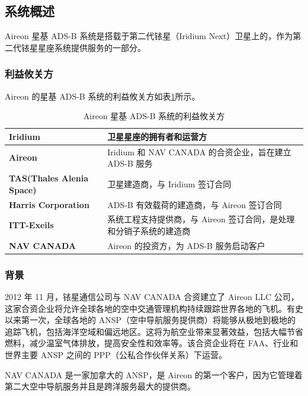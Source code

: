 \subsection{系统概述}

Aireon 星基 ADS-B 系统是搭载于第二代铱星（Iridium Next）卫星上的，作为第二代铱星星座系统提供服务的一部分。

\subsubsection{利益攸关方}

Aireon 的星基 ADS-B 系统的利益攸关方如表\ref{tab:stakeholders_of_Aireon_ads-b}所示。

\renewcommand\arraystretch{1.5}
\begin{table}[htbp]
\centering
\caption{Aireon 星基 ADS-B 系统的利益攸关方}
\label{tab:stakeholders_of_Aireon_ads-b}
\begin{tabular}[b]{|p{6cm}<{\raggedleft}|p{8cm}<{\raggedright}|}
\hline
\textbf{Iridium} & 卫星星座的拥有者和运营方 \\
\hline
\textbf{Aireon} & Iridium 和 NAV CANADA 的合资企业，旨在建立 ADS-B 服务 \\
\hline
\textbf{TAS(Thales Alenia Space)}& 卫星建造商，与 Iridium 签订合同 \\
\hline
\textbf{Harris Corporation} & ADS-B 有效载荷的建造商，与 Aireon 签订合同 \\
\hline
\textbf{ITT-Exeils} & 系统工程支持提供商，与 Aireon 签订合同，是处理和分销子系统的建造商 \\
\hline
\textbf{NAV CANADA} & Aireon 的投资方，为 ADS-B 服务启动客户 \\
\hline
\end{tabular}
\end{table}

\subsubsection{背景}

2012 年 11 月，铱星通信公司与 NAV CANADA 合资建立了 Aireon LLC 公司，这家合资企业将允许全球各地的空中交通管理机构持续跟踪世界各地的飞机。有史以来第一次，全球各地的 ANSP（空中导航服务提供商）将能够从极地到极地的追踪飞机，包括海洋空域和偏远地区。这将为航空业带来显著效益，包括大幅节省燃料，减少温室气体排放，提高安全性和效率等。该合资企业将在 FAA、行业和世界主要 ANSP 之间的 PPP（公私合作伙伴关系）下运营。

NAV CANADA 是一家加拿大的 ANSP，是 Aireon 的第一个客户，因为它管理着第二大空中导航服务并且是跨洋服务最大的提供商。

